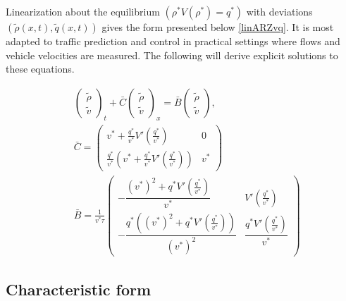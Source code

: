 \documentclass[a4paper, 10pt, conference]{ieeeconf}      %
\begin{document}
Linearization about the equilibrium $(\rho^*V(\rho^*) = q^*)$ with deviations $(\tilde{\rho}(x,t), \tilde{q}(x,t))$ gives the form presented below \eqref{linARZvq}. It is most adapted to traffic prediction and control in practical settings where flows and vehicle velocities are measured. The following will derive explicit solutions to these equations.

{\footnotesize
\begin{subequations} \label{linARZvq}
\begin{align}
&\begin{pmatrix}
	\tilde{\rho} \\
	\tilde{v}
\end{pmatrix}_t
+ \bar{C}
\begin{pmatrix}
	\tilde{\rho} \\ 
	\tilde{v}
\end{pmatrix}_x 
= 
\bar{B}
\begin{pmatrix}
	\tilde{\rho} \\
	\tilde{v}
\end{pmatrix}, \\
&\bar{C} 
=
\begin{pmatrix}
	v^* + \frac{q^*}{v^*} V'\left(\frac{q^*}{v^*}\right) & 0 \\
	\frac{q^*}{v^*} \left( v^* + \frac{q^*}{v^*} V'\left(\frac{q^*}{v^*}\right)\right) & v^*
\end{pmatrix} \\
&\bar{B} 
=
\frac{1}{v^{*}\tau}
\begin{pmatrix}
		-\dfrac{(v^*)^2+q^*V'\left(\frac{q^*}{v^*}\right)}{v^*} & V'\left(\frac{q^*}{v^*}\right) \\
		-\dfrac{q^*\left((v^*)^2 + q^*V'\left(\frac{q^*}{v^*}\right)\right)}{(v^*)^2}  & \dfrac{q^*V'\left(\frac{q^*}{v^*}\right)}{v^*}
\end{pmatrix}
\end{align}
\end{subequations}
}


\subsection{Characteristic form}
\end{document}
